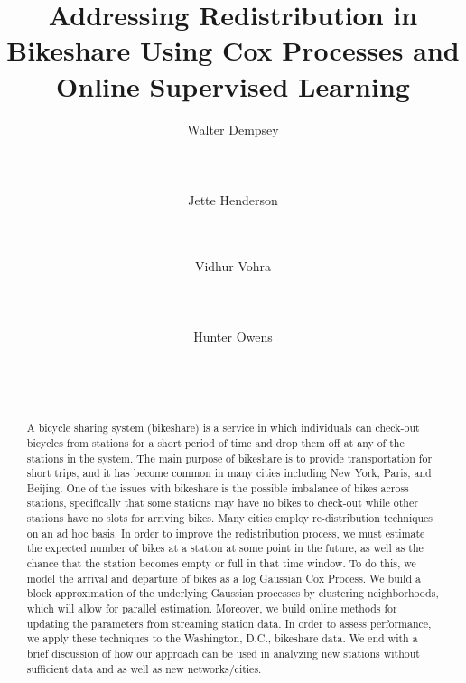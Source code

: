 \documentclass{acm_proc_article-sp}
\begin{document}
\title{Addressing Redistribution in Bikeshare Using Cox Processes and Online Supervised Learning}

\author{
\alignauthor Walter Dempsey\\
       \\
       \\
       \\
\alignauthor Jette Henderson\\
       \\
       \\
\and
\alignauthor  Vidhur Vohra\\
       \\
       \\
       \\
\alignauthor  Hunter Owens\\
       \\
       \\
       \\
}


\maketitle

\begin{abstract}
A bicycle sharing system (bikeshare) is a service in which individuals can check-out bicycles from stations for a short period of time and drop them off at any of the stations in the system. The main purpose of bikeshare is to provide transportation for short trips, and it has become common in many cities including New York, Paris, and Beijing. One of the issues with bikeshare is the possible imbalance of bikes across stations, specifically that some stations may have no bikes to check-out while other stations have no slots for arriving bikes. Many cities employ re-distribution techniques on an ad hoc basis. In order to improve the redistribution process, we must estimate the expected number of bikes at a station at some point in the future, as well as the chance that the station becomes empty or full in that time window. To do this, we model the arrival and departure of bikes as a log Gaussian Cox Process. We build a block approximation of the underlying Gaussian processes by clustering  neighborhoods, which will allow for parallel estimation. Moreover, we build online methods for updating the parameters from streaming station data. In order to assess performance, we apply these techniques to the Washington, D.C., bikeshare data. We end with a brief discussion of how our approach can be used in analyzing new stations without sufficient data and as well as new networks/cities. 
\end{abstract}
\end{document}
